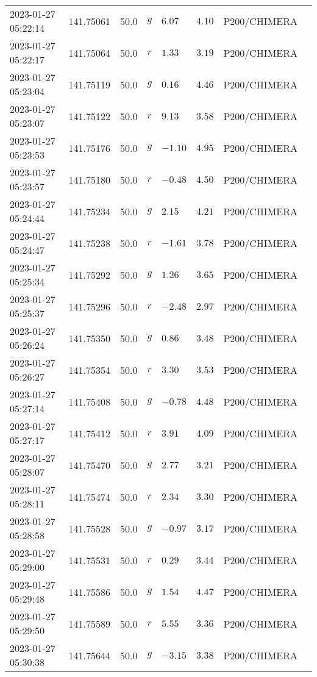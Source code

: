 \documentclass{nature_plusfigure}
\begin{document}
\begin{supplement}
\begin{center}
\begin{longtable}{llllllll}
2023-01-27 05:22:14 & 141.75061 & 50.0 & $g$ & $6.07$ & $4.10$ & P200/CHIMERA &  \\ 
2023-01-27 05:22:17 & 141.75064 & 50.0 & $r$ & $1.33$ & $3.19$ & P200/CHIMERA &  \\ 
2023-01-27 05:23:04 & 141.75119 & 50.0 & $g$ & $0.16$ & $4.46$ & P200/CHIMERA &  \\ 
2023-01-27 05:23:07 & 141.75122 & 50.0 & $r$ & $9.13$ & $3.58$ & P200/CHIMERA &  \\ 
2023-01-27 05:23:53 & 141.75176 & 50.0 & $g$ & $-1.10$ & $4.95$ & P200/CHIMERA &  \\ 
2023-01-27 05:23:57 & 141.75180 & 50.0 & $r$ & $-0.48$ & $4.50$ & P200/CHIMERA &  \\ 
2023-01-27 05:24:44 & 141.75234 & 50.0 & $g$ & $2.15$ & $4.21$ & P200/CHIMERA &  \\ 
2023-01-27 05:24:47 & 141.75238 & 50.0 & $r$ & $-1.61$ & $3.78$ & P200/CHIMERA &  \\ 
2023-01-27 05:25:34 & 141.75292 & 50.0 & $g$ & $1.26$ & $3.65$ & P200/CHIMERA &  \\ 
2023-01-27 05:25:37 & 141.75296 & 50.0 & $r$ & $-2.48$ & $2.97$ & P200/CHIMERA &  \\ 
2023-01-27 05:26:24 & 141.75350 & 50.0 & $g$ & $0.86$ & $3.48$ & P200/CHIMERA &  \\ 
2023-01-27 05:26:27 & 141.75354 & 50.0 & $r$ & $3.30$ & $3.53$ & P200/CHIMERA &  \\ 
2023-01-27 05:27:14 & 141.75408 & 50.0 & $g$ & $-0.78$ & $4.48$ & P200/CHIMERA &  \\ 
2023-01-27 05:27:17 & 141.75412 & 50.0 & $r$ & $3.91$ & $4.09$ & P200/CHIMERA &  \\ 
2023-01-27 05:28:07 & 141.75470 & 50.0 & $g$ & $2.77$ & $3.21$ & P200/CHIMERA &  \\ 
2023-01-27 05:28:11 & 141.75474 & 50.0 & $r$ & $2.34$ & $3.30$ & P200/CHIMERA &  \\ 
2023-01-27 05:28:58 & 141.75528 & 50.0 & $g$ & $-0.97$ & $3.17$ & P200/CHIMERA &  \\ 
2023-01-27 05:29:00 & 141.75531 & 50.0 & $r$ & $0.29$ & $3.44$ & P200/CHIMERA &  \\ 
2023-01-27 05:29:48 & 141.75586 & 50.0 & $g$ & $1.54$ & $4.47$ & P200/CHIMERA &  \\ 
2023-01-27 05:29:50 & 141.75589 & 50.0 & $r$ & $5.55$ & $3.36$ & P200/CHIMERA &  \\ 
2023-01-27 05:30:38 & 141.75644 & 50.0 & $g$ & $-3.15$ & $3.38$ & P200/CHIMERA &  \\ 

\end{longtable}
\end{center}
\end{supplement}
\end{document}
